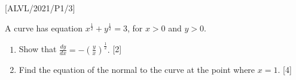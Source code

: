 \item {[}ALVL/2021/P1/3{]}

A curve has equation $x^{\frac{1}{2}}+y^{\frac{1}{2}}=3$, for $x>0$
and $y>0$. 
\begin{enumerate}
\item Show that $\frac{dy}{dx}=-\left(\frac{y}{x}\right)^{\frac{1}{2}}.$
\hfill{}{[}2{]}
\item Find the equation of the normal to the curve at the point where $x=1$.
\hfill{}{[}4{]}
\end{enumerate}
